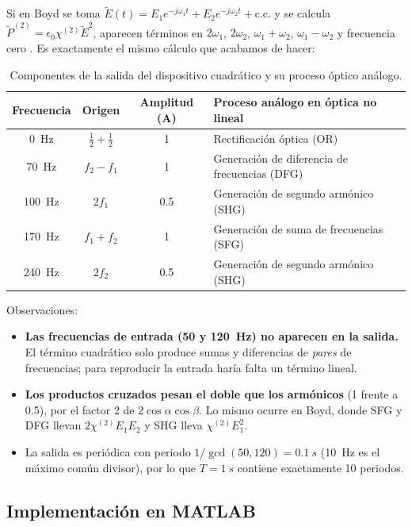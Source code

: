 \documentclass[11pt,letterpaper]{article}
\begin{document}
Si en Boyd se toma $\tilde E(t)=E_1e^{-j\omega_1t}+E_2e^{-j\omega_2t}+\text{c.c.}$ y se calcula
$\tilde P^{(2)}=\epsilon_0\chi^{(2)}\tilde E^2$, aparecen términos en $2\omega_1$, $2\omega_2$,
$\omega_1+\omega_2$, $\omega_1-\omega_2$ y frecuencia cero \cite[ecs.~(1.2.3)--(1.2.5), p.~6]{boyd}.
Es exactamente el mismo cálculo que acabamos de hacer:

\begin{table}[h]
\centering
\caption{Componentes de la salida del dispositivo cuadrático y su proceso óptico análogo.}
\label{tab:2a}
\begin{tabular}{@{}cccl@{}}
\toprule
Frecuencia & Origen & Amplitud (A) & Proceso análogo en óptica no lineal \\
\midrule
\SI{0}{Hz}   & $\tfrac12+\tfrac12$         & 1   & Rectificación óptica (OR) \\
\SI{70}{Hz}  & $f_2-f_1$                   & 1   & Generación de diferencia de frecuencias (DFG) \\
\SI{100}{Hz} & $2f_1$                      & 0.5 & Generación de segundo armónico (SHG) \\
\SI{170}{Hz} & $f_1+f_2$                   & 1   & Generación de suma de frecuencias (SFG) \\
\SI{240}{Hz} & $2f_2$                      & 0.5 & Generación de segundo armónico (SHG) \\
\bottomrule
\end{tabular}
\end{table}

Observaciones:
\begin{itemize}
  \item \textbf{Las frecuencias de entrada (50 y \SI{120}{Hz}) no aparecen en la salida.} El término
  cuadrático solo produce sumas y diferencias de \emph{pares} de frecuencias; para reproducir la entrada
  haría falta un término lineal.
  \item \textbf{Los productos cruzados pesan el doble que los armónicos} (1 frente a 0.5), por el factor
  2 de $2\cos\alpha\cos\beta$. Lo mismo ocurre en Boyd, donde SFG y DFG llevan $2\chi^{(2)}E_1E_2$ y SHG lleva
  $\chi^{(2)}E_1^2$.
  \item La salida es periódica con periodo $1/\gcd(50,120)=\SI{0.1}{s}$ (\SI{10}{Hz} es el máximo común
  divisor), por lo que $T=\SI{1}{s}$ contiene exactamente 10 periodos.
\end{itemize}

\subsection{Implementación en MATLAB}
\end{document}

